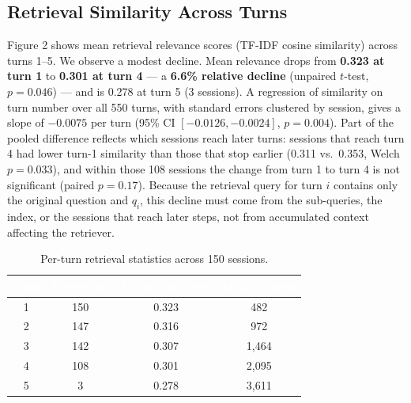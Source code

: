 \documentclass[11pt,a4paper]{article}
\begin{document}
\subsection{Retrieval Similarity Across Turns}
Figure 2 shows mean retrieval relevance scores (TF-IDF cosine similarity) across turns 1--5. We observe a
modest decline. Mean relevance drops from \textbf{0.323 at turn 1} to \textbf{0.301 at turn 4} --- a
\textbf{6.6\% relative decline} (unpaired $t$-test, $p = 0.046$) --- and is 0.278 at turn 5 (3 sessions). A
regression of similarity on turn number over all 550 turns, with standard errors clustered by session, gives a
slope of $-0.0075$ per turn (95\% CI $[-0.0126, -0.0024]$, $p = 0.004$). Part of the pooled difference reflects
which sessions reach later turns: sessions that reach turn 4 had lower turn-1 similarity than those that stop
earlier (0.311 vs.\ 0.353, Welch $p = 0.033$), and within those 108 sessions the change from turn 1 to turn 4 is
not significant (paired $p = 0.17$). Because the retrieval query for turn $i$ contains only the original question
and $q_i$, this decline must come from the sub-queries, the index, or the sessions that reach later steps, not
from accumulated context affecting the retriever.

\begin{table}[H]
\centering
\renewcommand{\arraystretch}{1.35}
\begin{tabular}{cccc}
\toprule
\rowcolor{headerblue}
\textcolor{white}{\textbf{Turn}} &
\textcolor{white}{\textbf{N Sessions}} &
\textcolor{white}{\textbf{Mean Similarity}} &
\textcolor{white}{\textbf{Mean Tokens}} \\
\midrule
\rowcolor{rowgray} 1 & 150 & 0.323 & 482   \\
                   2 & 147 & 0.316 & 972   \\
\rowcolor{rowgray} 3 & 142 & 0.307 & 1,464 \\
                   4 & 108 & 0.301 & 2,095 \\
\rowcolor{rowgray} 5 & 3   & 0.278 & 3,611 \\
\bottomrule
\end{tabular}
\caption{Per-turn retrieval statistics across 150 sessions.}
\end{table}
\end{document}
